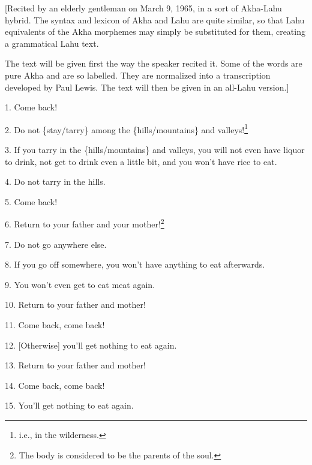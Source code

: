 \setcounter{footnote}{0}

[Recited by an elderly gentleman on March 9, 1965, in a sort of Akha-Lahu hybrid.
The syntax and lexicon of Akha and Lahu are quite similar, so that Lahu equivalents
of the Akha morphemes may simply be substituted for them, creating a grammatical
Lahu text.

The text will be given first the way the speaker recited it. Some of the words
are pure Akha and are so labelled. They are normalized into a transcription developed
by Paul Lewis. The text will then be given in an all-Lahu version.]

1. Come back!

2. Do not \{stay/tarry\} among the \{hills/mountains\} and valleys!\footnote{i.e., in the wilderness.}

3. If you tarry in the \{hills/mountains\} and valleys, you will not even have liquor
to drink, not get to drink even a little bit, and you won't have rice to eat.

4. Do not tarry in the hills.

5. Come back!

6. Return to your father and your mother!\footnote{The body is considered to be the parents of the soul.}

7. Do not go anywhere else.

8. If you go off somewhere, you won't have anything to eat afterwards.

9. You won't even get to eat meat again.

10. Return to your father and mother!

11. Come back, come back!

12. [Otherwise] you'll get nothing to eat again.

13. Return to your father and mother!

14. Come back, come back!

15. You'll get nothing to eat again.

